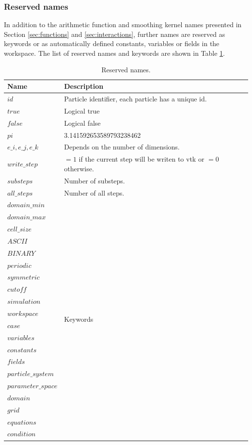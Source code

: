 \documentclass[a4paper,12pt,openany]{book}
\theoremstyle{break}
\begin{document}
\subsubsection{Reserved names}
In addition to the arithmetic function and smoothing kernel names presented in Section \ref{sec:functions} and \ref{sec:interactions}, further names are reserved as keywords or as automatically defined constants, variables or fields in the workspace. The list of reserved names and keywords are shown in Table \ref{tbl:reserved}.
\begin{table} [H]
\begin{center}
\caption{Reserved names.} \label{tbl:reserved}
\begin{tabular}{ l l }
\toprule[1.5pt]
\bf Name & \bf Description\\
\midrule
$id$ & Particle identifier, each particle has a unique id. \\
$true$ & Logical true\\
$false$ & Logical false  \\
$pi$ & 3.141592653589793238462\\
$e\_i, e\_j, e\_k$ & Depends on the number of dimensions. \\
$write\_step$ & $=1$ if the current step will be writen to vtk or $=0$ otherwise. \\
$substeps$ & Number of substeps. \\
$all\_steps$ & Number of all steps. \\
\bottomrule[1.25pt]
$domain\_min$ & \multirow{20}{*}{Keywords}\\
$domain\_max$ & \\
$cell\_size$ & \\
$ASCII$ & \\
$BINARY$ & \\
$periodic$ & \\
$symmetric$ & \\
$cutoff$ & \\
$simulation$ & \\
$workspace$ & \\
$case$ & \\
$variables$ & \\
$constants$ & \\
$fields$ & \\
$particle\_system$ & \\
$parameter\_space$ & \\
$domain$ & \\
$grid$ & \\
$equations$ & \\
$condition$ & \\
\bottomrule[1.25pt]
\end{tabular}
\end{center}
\end{table}
\end{document}
